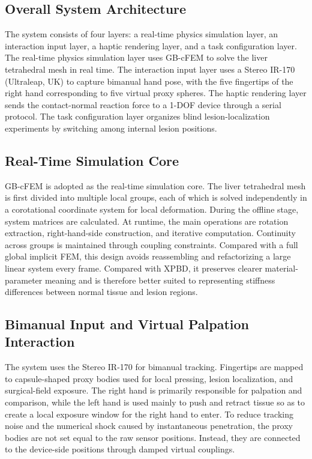 \documentclass{ieeeaccess}
\begin{document}
\subsection{Overall System Architecture}
The system consists of four layers: a real-time physics simulation layer, an interaction input layer, a haptic rendering layer, and a task configuration layer. The real-time physics simulation layer uses GB-cFEM to solve the liver tetrahedral mesh in real time. The interaction input layer uses a Stereo IR-170 (Ultraleap, UK) to capture bimanual hand pose, with the five fingertips of the right hand corresponding to five virtual proxy spheres. The haptic rendering layer sends the contact-normal reaction force to a 1-DOF device through a serial protocol. The task configuration layer organizes blind lesion-localization experiments by switching among internal lesion positions.

\subsection{Real-Time Simulation Core}
GB-cFEM is adopted as the real-time simulation core. The liver tetrahedral mesh is first divided into multiple local groups, each of which is solved independently in a corotational coordinate system for local deformation. During the offline stage, system matrices are calculated. At runtime, the main operations are rotation extraction, right-hand-side construction, and iterative computation. Continuity across groups is maintained through coupling constraints. Compared with a full global implicit FEM, this design avoids reassembling and refactorizing a large linear system every frame. Compared with XPBD, it preserves clearer material-parameter meaning and is therefore better suited to representing stiffness differences between normal tissue and lesion regions.

\subsection{Bimanual Input and Virtual Palpation Interaction}
The system uses the Stereo IR-170 for bimanual tracking. Fingertips are mapped to capsule-shaped proxy bodies used for local pressing, lesion localization, and surgical-field exposure. The right hand is primarily responsible for palpation and comparison, while the left hand is used mainly to push and retract tissue so as to create a local exposure window for the right hand to enter. To reduce tracking noise and the numerical shock caused by instantaneous penetration, the proxy bodies are not set equal to the raw sensor positions. Instead, they are connected to the device-side positions through damped virtual couplings.
\end{document}
